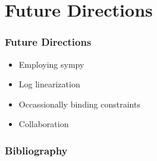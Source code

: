 \documentclass[tikz]{beamer}
\begin{document}
\section{Future Directions}

\begin{frame}
  \frametitle{Future Directions}
  \begin{itemize}
  \item Employing sympy
 \item Log linearization 
\item Occassionally binding constraints
\item Collaboration %
  \end{itemize}
\end{frame}

\begin{frame}
  \frametitle{Bibliography}
  


\end{frame}



\end{document}
